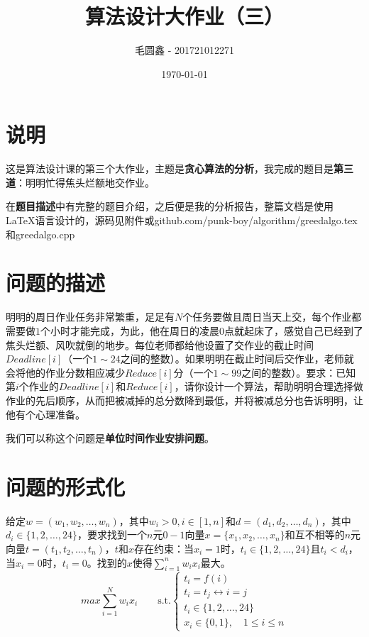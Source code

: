 \documentclass[11pt]{ctexart}
\title{\huge\bf
算法设计大作业（三）}
\author{毛圆鑫 - 201721012271}
\date{\today}
\begin{document}
\maketitle
\section*{说明}
这是算法设计课的第三个大作业，主题是\textbf{贪心算法的分析}，我完成的题目是\textbf{第三道}：明明忙得焦头烂额地交作业。

在\textbf{题目描述}中有完整的题目介绍，之后便是我的分析报告，整篇文档是使用 \LaTeX 语言设计的，源码见附件或github.com/punk-boy/algorithm/greedalgo.tex和greedalgo.cpp


\section{问题的描述}
明明的周日作业任务非常繁重，足足有$N$个任务要做且周日当天上交，每个作业都需要做$1$个小时才能完成，为此，他在周日的凌晨$0$点就起床了，感觉自己已经到了焦头烂额、风吹就倒的地步。每位老师都给他设置了交作业的截止时间$Deadline[i]$（一个$1\sim 24$之间的整数）。如果明明在截止时间后交作业，老师就会将他的作业分数相应减少$Reduce[i]$分（一个$1\sim 99$之间的整数）。要求：已知第$i$个作业的$Deadline[i]$和$Reduce[i]$，请你设计一个算法，帮助明明合理选择做作业的先后顺序，从而把被减掉的总分数降到最低，并将被减总分也告诉明明，让他有个心理准备。

我们可以称这个问题是\textbf{单位时间作业安排问题}。

\section{问题的形式化}

给定$w=(w_1,w_2,\dots,w_n)$，其中$w_i>0,i\in [1,n]$和$d=(d_1,d_2,\dots,d_n)$，其中$d_i \in \{1,2,\dots,24\}$，要求找到一个$n$元$0-1$向量$x=\{x_1, x_2, \dots ,x_n\}$和互不相等的$n$元向量$t=(t_1,t_2,\dots,t_n)$，$t$和$x$存在约束：当$x_i=1$时，$t_i \in \{1,2,\dots,24\}$且$t_i<d_i$，当$x_i=0$时，$t_i=0$。找到的$x$使得$\sum_{i=1}^{n}w_i x_i$最大。
$$
max\sum_{i=1}^{N}w_i x_i \qquad\mathrm{s.t.}  \left\{\begin{array}{cc}
    t_i = f(i)\\
    t_i = t_j \leftrightarrow i=j \\
    t_i\in \{1,2,\dots,24\}\\
    x_i \in \{0,1\},\quad 1\leqslant i \leqslant n
\end{array}\right.
$$
\end{document}
